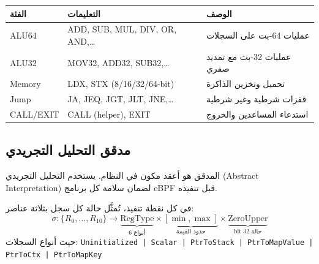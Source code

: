 \documentclass[12pt,a4paper]{article}
\theoremstyle{definition}
\newcommand{\codeinline}[1]{\texttt{\small #1}}
\newcommand{\en}[1]{\textenglish{#1}}
\begin{document}
\begin{center}
\begin{tabular}{C{2.5cm}L{5cm}L{4.5cm}}
\toprule
{}
\bfseries\color{accent4}\textarabic{الفئة} &
\bfseries\color{accent4}\textarabic{التعليمات} &
\bfseries\color{accent4}\textarabic{الوصف} \\
\midrule
{} ALU64 &
  ADD, SUB, MUL, DIV, OR, AND,\ldots &
  عمليات 64-بت على السجلات \\
ALU32 &
  MOV32, ADD32, SUB32,\ldots &
  عمليات 32-بت مع تمديد صفري \\
 Memory &
  LDX, STX (8/16/32/64-bit) &
  تحميل وتخزين الذاكرة \\
Jump &
  JA, JEQ, JGT, JLT, JNE,\ldots &
  قفزات شرطية وغير شرطية \\
 CALL/EXIT &
  CALL (helper), EXIT &
  استدعاء المساعدين والخروج \\
\bottomrule
\end{tabular}
\end{center}

\subsection{مدقق التحليل التجريدي}

المدقق هو أعقد مكون في النظام. يستخدم التحليل التجريدي (\en{Abstract Interpretation}) لضمان سلامة كل برنامج eBPF قبل تنفيذه.

\begin{definitionbox}
في كل نقطة تنفيذ، تُمثَّل حالة كل سجل بثلاثة عناصر:
\begin{equation}
\sigma : \{R_0, \ldots, R_{10}\} \to \underbrace{\mathrm{RegType}}_{\text{6 أنواع}}
  \times \underbrace{[\min,\max]}_{\text{حدود القيمة}}
  \times \underbrace{\mathrm{ZeroUpper}}_{\text{bit 32 حالة}}
\end{equation}
حيث أنواع السجلات:
\codeinline{Uninitialized | Scalar | PtrToStack | PtrToMapValue | PtrToCtx | PtrToMapKey}
\end{definitionbox}
\end{document}
